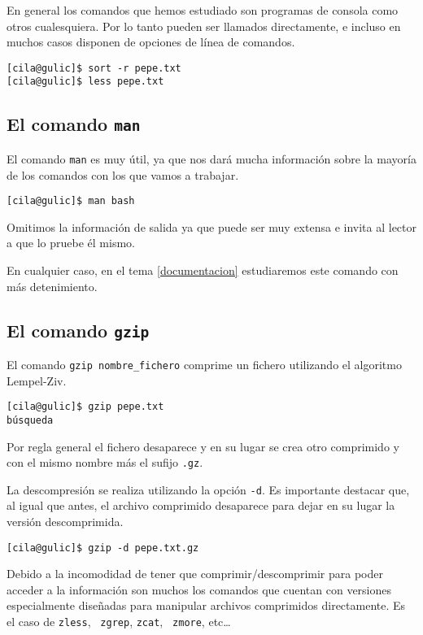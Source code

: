 En general los comandos que hemos estudiado son programas de consola
como otros cualesquiera. Por lo tanto pueden ser llamados
directamente, e incluso en muchos casos disponen de opciones de línea
de comandos.

\begin{verbatim}
[cila@gulic]$ sort -r pepe.txt
[cila@gulic]$ less pepe.txt
\end{verbatim}

\subsection{El comando {\tt man}}

El comando  {\tt man} es muy  útil, ya que nos  dará mucha información
sobre la mayoría de los comandos con los que vamos a trabajar.

\begin{verbatim}
[cila@gulic]$ man bash
\end{verbatim}

Omitimos  la información  de salida  ya que  puede ser  muy extensa  e
invita al lector a que lo pruebe él mismo.

En cualquier  caso, en  el tema \ref{documentacion}  estudiaremos este
comando con más detenimiento.

\subsection{El comando {\tt gzip}}

El comando  {\tt gzip nombre\_fichero} comprime  un fichero utilizando
el algoritmo {\sf Lempel-Ziv}.

\begin{verbatim}
[cila@gulic]$ gzip pepe.txt
búsqueda  \end{verbatim}

Por regla  general el fichero  desaparece y en  su lugar se  crea otro
comprimido y con el mismo nombre más el sufijo {\tt .gz}.

La  descompresión  se  realiza  utilizando  la  opción  {\tt  -d}.  Es
importante destacar  que, al  igual que  antes, el  archivo comprimido
desaparece para dejar en su lugar la versión descomprimida.

\begin{verbatim}
[cila@gulic]$ gzip -d pepe.txt.gz
\end{verbatim}

Debido a la incomodidad de tener que comprimir/descomprimir para poder
acceder  a la  información son  muchos  los comandos  que cuentan  con
versiones especialmente diseñadas  para manipular archivos comprimidos
directamente. Es  el caso  de {\tt  zless}, {\tt
zgrep},  {\tt  zcat},  {\tt
zmore}, etc\dots

